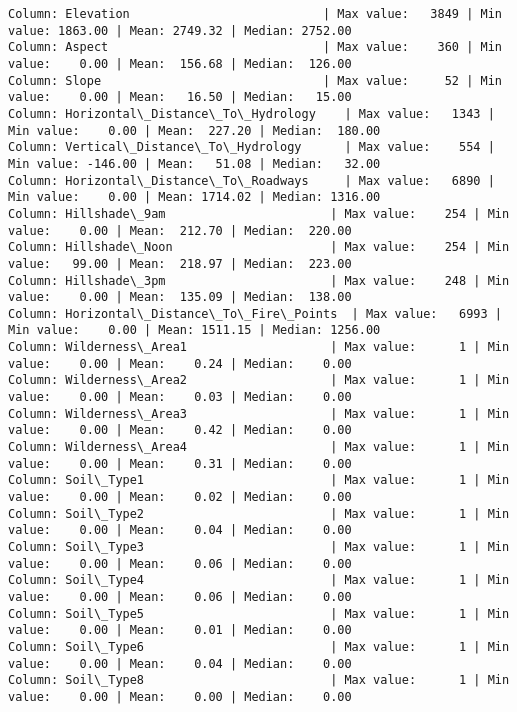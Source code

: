 \documentclass[11pt]{article}
\begin{document}
    \begin{Verbatim}[commandchars=\\\{\}]
Column: Elevation                           | Max value:   3849 | Min value: 1863.00 | Mean: 2749.32 | Median: 2752.00
Column: Aspect                              | Max value:    360 | Min value:    0.00 | Mean:  156.68 | Median:  126.00
Column: Slope                               | Max value:     52 | Min value:    0.00 | Mean:   16.50 | Median:   15.00
Column: Horizontal\_Distance\_To\_Hydrology    | Max value:   1343 | Min value:    0.00 | Mean:  227.20 | Median:  180.00
Column: Vertical\_Distance\_To\_Hydrology      | Max value:    554 | Min value: -146.00 | Mean:   51.08 | Median:   32.00
Column: Horizontal\_Distance\_To\_Roadways     | Max value:   6890 | Min value:    0.00 | Mean: 1714.02 | Median: 1316.00
Column: Hillshade\_9am                       | Max value:    254 | Min value:    0.00 | Mean:  212.70 | Median:  220.00
Column: Hillshade\_Noon                      | Max value:    254 | Min value:   99.00 | Mean:  218.97 | Median:  223.00
Column: Hillshade\_3pm                       | Max value:    248 | Min value:    0.00 | Mean:  135.09 | Median:  138.00
Column: Horizontal\_Distance\_To\_Fire\_Points  | Max value:   6993 | Min value:    0.00 | Mean: 1511.15 | Median: 1256.00
Column: Wilderness\_Area1                    | Max value:      1 | Min value:    0.00 | Mean:    0.24 | Median:    0.00
Column: Wilderness\_Area2                    | Max value:      1 | Min value:    0.00 | Mean:    0.03 | Median:    0.00
Column: Wilderness\_Area3                    | Max value:      1 | Min value:    0.00 | Mean:    0.42 | Median:    0.00
Column: Wilderness\_Area4                    | Max value:      1 | Min value:    0.00 | Mean:    0.31 | Median:    0.00
Column: Soil\_Type1                          | Max value:      1 | Min value:    0.00 | Mean:    0.02 | Median:    0.00
Column: Soil\_Type2                          | Max value:      1 | Min value:    0.00 | Mean:    0.04 | Median:    0.00
Column: Soil\_Type3                          | Max value:      1 | Min value:    0.00 | Mean:    0.06 | Median:    0.00
Column: Soil\_Type4                          | Max value:      1 | Min value:    0.00 | Mean:    0.06 | Median:    0.00
Column: Soil\_Type5                          | Max value:      1 | Min value:    0.00 | Mean:    0.01 | Median:    0.00
Column: Soil\_Type6                          | Max value:      1 | Min value:    0.00 | Mean:    0.04 | Median:    0.00
Column: Soil\_Type8                          | Max value:      1 | Min value:    0.00 | Mean:    0.00 | Median:    0.00

\end{Verbatim}
\end{document}
